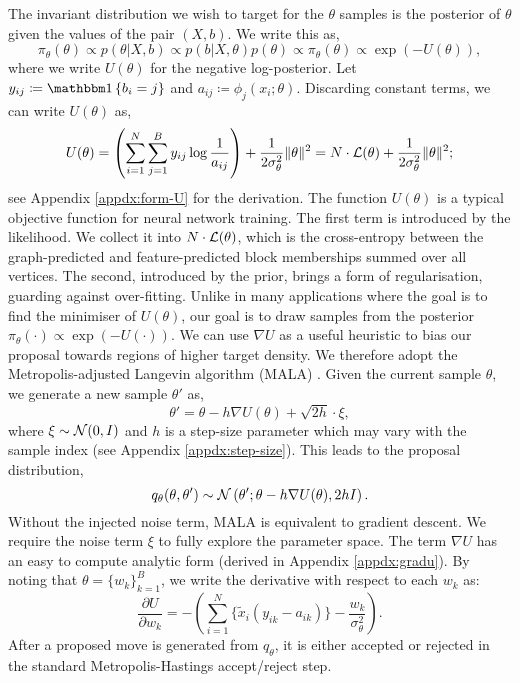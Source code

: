 The invariant distribution we wish to target for the $\theta$ samples is the posterior of $\theta$ given the values of the pair $(X, b)$. 
We write this as,
%
\begin{equation}
	\pi_\theta(\theta) \propto p(\theta | X, b) \propto p(b | X, \theta) p(\theta) \propto \pi_\theta (\theta) \propto  \exp \left( - U(\theta) \right),
	\label{eq:U}
\end{equation}
%
where we write $U(\theta)$ for the negative log-posterior. Let $y_{ij} \coloneqq \one \left\{ b_i = j \right\}$ and $a_{ij} \coloneqq \phi_j(x_i; \theta)$. 
Discarding constant terms, we can write $U(\theta)$ as,
%
\begin{equation}
	U(\theta) = \left( \sum_{i=1}^{N} \sum_{j=1}^{B} y_{ij} \log \frac{1}{a_{ij}} \right)
	+ \frac{1}{2\sigma_\theta^2} \|\theta\|^2 = N \cdot \mathcal{L}(\theta) + \frac{1}{2\sigma_\theta^2} \|\theta\|^2;
	\label{eqn:U-form}
\end{equation}
see Appendix \ref{appdx:form-U} for the derivation.
%
The function $U(\theta)$ is a typical objective function for neural network training. The first term is introduced by the likelihood. We collect it into $N \cdot \mathcal{L}(\theta)$, which is the cross-entropy between the graph-predicted and feature-predicted block memberships summed over all vertices. 
The second, introduced by the prior, brings a form of regularisation, guarding against over-fitting. Unlike in many applications where the goal 
is to find the minimiser of $U(\theta)$, our goal is to draw samples from the posterior $\pi_\theta(\cdot) \propto \exp(-U(\cdot))$. We can use $\nabla U$ as a useful heuristic to bias our proposal towards regions of higher target density. We therefore adopt the Metropolis-adjusted Langevin algorithm (MALA) \cite{mala-tweedie}. Given the current sample $\theta$, we generate 
a new sample $\theta'$ as,
%
$$	\theta' = \theta - h \nabla U(\theta) + \sqrt{2h} \cdot \xi,$$
where $\xi \sim \mathcal{N}(0, I)$ and $h$ is a step-size parameter 
which may vary with the sample index (see Appendix \ref{appdx:step-size}).
This leads to the proposal distribution,
$$q_\theta(\theta, \theta') \sim \mathcal{N} \left( \theta' ; \theta - h \nabla U(\theta), 2h I \right).$$
Without the injected noise term, MALA is equivalent to gradient descent. We require the noise term $\xi$ to fully explore the parameter space. 
The term $\nabla U$ has an easy to compute analytic form (derived in Appendix \ref{appdx:gradu}). By noting that $\theta = \{w_k\}_{k=1}^{B}$, we write the derivative with respect to each $w_k$ as:
%
\begin{equation}
	\frac{\partial U}{\partial w_k} = - \left( \sum_{i=1}^{N} \Big\{ \tilde{x}_i (y_{ik} - a_{ik}) \Big\} - \frac{w_k}{\sigma_\theta^2} \right).
	\label{eqn:U-derivative}
\end{equation}
%
After a proposed move is generated from $q_\theta$,
it is either accepted or rejected in the standard
Metropolis-Hastings accept/reject step.

